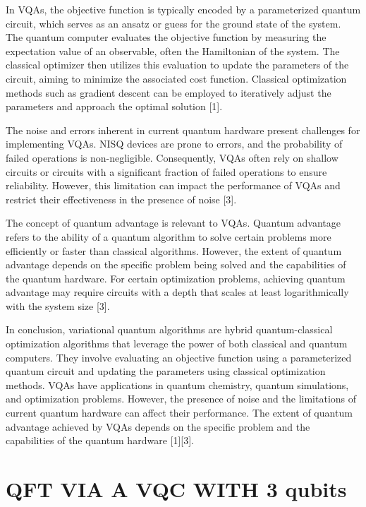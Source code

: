\documentclass[inscr,ack,preface]{diphdthesis}
\begin{document}
In VQAs, the objective function is typically encoded by a parameterized quantum circuit, which serves as an ansatz or guess for the ground state of the system. The quantum computer evaluates the objective function by measuring the expectation value of an observable, often the Hamiltonian of the system. The classical optimizer then utilizes this evaluation to update the parameters of the circuit, aiming to minimize the associated cost function. Classical optimization methods such as gradient descent can be employed to iteratively adjust the parameters and approach the optimal solution [1].

The noise and errors inherent in current quantum hardware present challenges for implementing VQAs. NISQ devices are prone to errors, and the probability of failed operations is non-negligible. Consequently, VQAs often rely on shallow circuits or circuits with a significant fraction of failed operations to ensure reliability. However, this limitation can impact the performance of VQAs and restrict their effectiveness in the presence of noise [3].

The concept of quantum advantage is relevant to VQAs. Quantum advantage refers to the ability of a quantum algorithm to solve certain problems more efficiently or faster than classical algorithms. However, the extent of quantum advantage depends on the specific problem being solved and the capabilities of the quantum hardware. For certain optimization problems, achieving quantum advantage may require circuits with a depth that scales at least logarithmically with the system size [3].

In conclusion, variational quantum algorithms are hybrid quantum-classical optimization algorithms that leverage the power of both classical and quantum computers. They involve evaluating an objective function using a parameterized quantum circuit and updating the parameters using classical optimization methods. VQAs have applications in quantum chemistry, quantum simulations, and optimization problems. However, the presence of noise and the limitations of current quantum hardware can affect their performance. The extent of quantum advantage achieved by VQAs depends on the specific problem and the capabilities of the quantum hardware [1][3].


\chapter{ QFT VIA A  VQC WITH 3 qubits}

\label{sec:qft_vqc}
\end{document}
